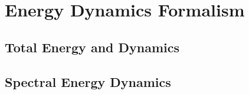 \chapter{Energy Dynamics Formalism}
\label{c_en_formalism}

\section{Total Energy and Dynamics}
\label{s_tot_en_dyn}

\section{Spectral Energy Dynamics}
\label{s_spec_en_dyn}

